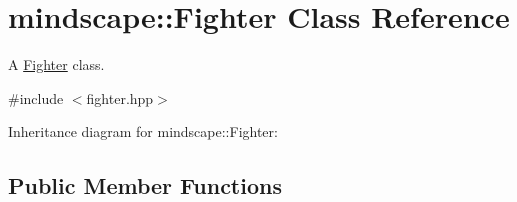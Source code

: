 \hypertarget{classmindscape_1_1_fighter}{}\section{mindscape\+:\+:Fighter Class Reference}
\label{classmindscape_1_1_fighter}


A \hyperlink{classmindscape_1_1_fighter}{Fighter} class.  




{\ttfamily \#include $<$fighter.\+hpp$>$}



Inheritance diagram for mindscape\+:\+:Fighter\+:
\subsection*{Public Member Functions}
